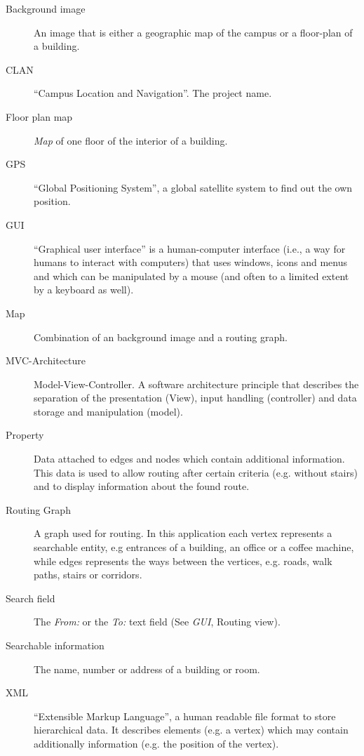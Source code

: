 \begin{description}

\item[Background image] An image that is either a geographic map of the campus or a floor-plan of a building.

\item[CLAN] ``Campus Location and Navigation''. The project name.

\item[Floor plan map] \textit{Map} of one floor of the interior of a building.

\item[GPS] ``Global Positioning System'', a global satellite system to find out the own position.

\item[GUI] ``Graphical user interface'' is a human-computer interface (i.e., a way for humans to interact with computers) that uses windows, icons and menus and which can be manipulated by a mouse (and often to a limited extent by a keyboard as well).

\item[Map] Combination of an background image and a routing graph.

\item[MVC-Architecture] Model-View-Controller. A software architecture principle that describes the separation of the presentation (View), input handling (controller) and data storage and manipulation (model).


\item[Property]
Data attached to edges and nodes which contain additional information. This data is used to allow routing after certain criteria (e.g. without stairs) and to display information about the found route.

\item[Routing Graph] A graph used for routing. In this application each vertex represents a searchable entity, e.g entrances of a building, an office or a coffee machine, while edges represents the ways between the vertices, e.g. roads, walk paths, stairs or corridors.

\item[Search field] The \emph{From:} or the \emph{To:} text field (See \textit{GUI}, Routing view).

\item[Searchable information] The name, number or address of a building or room.

\item[XML] ``Extensible Markup Language'', a human readable file format to store hierarchical data. It describes elements (e.g. a vertex) which may contain additionally information (e.g. the position of the vertex).

\end{description}
